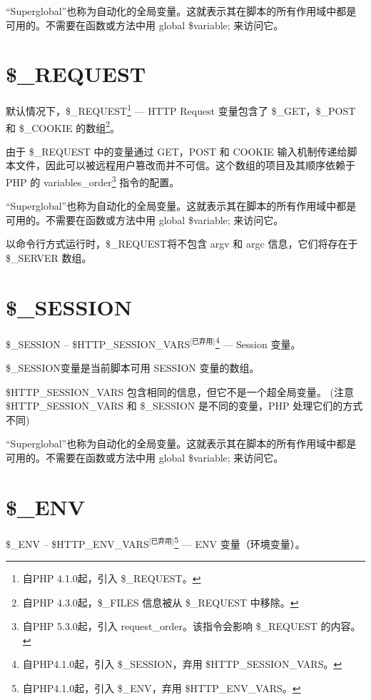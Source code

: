 “Superglobal”也称为自动化的全局变量。这就表示其在脚本的所有作用域中都是可用的。不需要在函数或方法中用 global \$variable; 来访问它。




\section{\$\_REQUEST}


默认情况下，\$\_REQUEST\footnote{自PHP 4.1.0起，引入 \$\_REQUEST。} — HTTP Request 变量包含了 \$\_GET，\$\_POST 和 \$\_COOKIE 的数组\footnote{自PHP 4.3.0起，\$\_FILES 信息被从 \$\_REQUEST 中移除。}。

由于 \$\_REQUEST 中的变量通过 GET，POST 和 COOKIE 输入机制传递给脚本文件，因此可以被远程用户篡改而并不可信。这个数组的项目及其顺序依赖于 PHP 的 variables\_order\footnote{自PHP 5.3.0起，引入 request\_order。该指令会影响 \$\_REQUEST 的内容。} 指令的配置。

“Superglobal”也称为自动化的全局变量。这就表示其在脚本的所有作用域中都是可用的。不需要在函数或方法中用 global \$variable; 来访问它。

以命令行方式运行时，\$\_REQUEST将不包含 argv 和 argc 信息，它们将存在于 \$\_SERVER 数组。




\section{\$\_SESSION}


\$\_SESSION -- \$HTTP\_SESSION\_VARS$^{\text{[已弃用]}}$\footnote{自PHP4.1.0起，引入 \$\_SESSION，弃用 \$HTTP\_SESSION\_VARS。} — Session 变量。


\$\_SESSION变量是当前脚本可用 SESSION 变量的数组。

\$HTTP\_SESSION\_VARS 包含相同的信息，但它不是一个超全局变量。 (注意 \$HTTP\_SESSION\_VARS 和 \$\_SESSION 是不同的变量，PHP 处理它们的方式不同)

“Superglobal”也称为自动化的全局变量。这就表示其在脚本的所有作用域中都是可用的。不需要在函数或方法中用 global \$variable; 来访问它。





\section{\$\_ENV}


\$\_ENV -- \$HTTP\_ENV\_VARS$^{\text{[已弃用]}}$\footnote{自PHP4.1.0起，引入 \$\_ENV，弃用 \$HTTP\_ENV\_VARS。} — ENV 变量（环境变量）。


